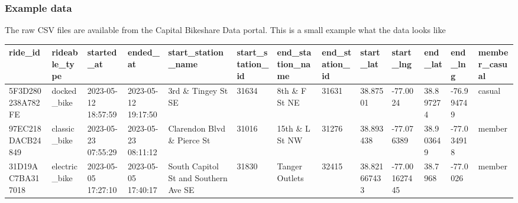 \documentclass{beamer}
\begin{document}
\begin{frame}
    \frametitle{Example data}
    The raw CSV files are available from the Capital Bikeshare Data portal. This is a small example what the data looks like
    \begin{table}[]
        \begin{tabular}{lllllllllllll}
            \hline
            \multicolumn{1}{|l|}{ride\_id} & \multicolumn{1}{l|}{rideable\_type} & \multicolumn{1}{l|}{started\_at} & \multicolumn{1}{l|}{ended\_at} & \multicolumn{1}{l|}{start\_station\_name} & \multicolumn{1}{l|}{start\_station\_id} & \multicolumn{1}{l|}{end\_station\_name} & \multicolumn{1}{l|}{end\_station\_id} & \multicolumn{1}{l|}{start\_lat} & \multicolumn{1}{l|}{start\_lng} & \multicolumn{1}{l|}{end\_lat} & \multicolumn{1}{l|}{end\_lng} & \multicolumn{1}{l|}{member\_casual} \\ \hline
            5F3D280238A782FE               & docked\_bike                        & 2023-05-12 18:57:59              & 2023-05-12 19:17:50            & 3rd \& Tingey St SE                       & 31634                                   & 8th \& F St NE                          & 31631                                 & 38.87501                        & -77.0024                        & 38.897274                     & -76.994749                    & casual                              \\
            97EC218DACB24849               & classic\_bike                       & 2023-05-23 07:55:29              & 2023-05-23 08:11:12            & Clarendon Blvd \& Pierce St               & 31016                                   & 15th \& L St NW                         & 31276                                 & 38.893438                       & -77.076389                      & 38.903649                     & -77.034918                    & member                              \\
            31D19AC7BA317018               & electric\_bike                      & 2023-05-05 17:27:10              & 2023-05-05 17:40:17            & South Capitol St and Southern Ave SE      & 31830                                   & Tanger Outlets                          & 32415                                 & 38.821667433                    & -77.001627445                   & 38.7968                       & -77.0026                      & member
        \end{tabular}
    \end{table}
\end{frame}
\end{document}
